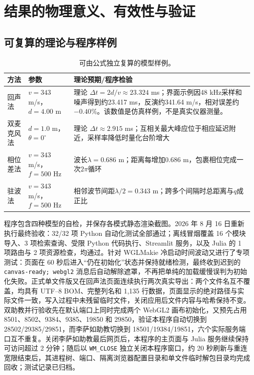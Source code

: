 \documentclass[UTF8,a4paper,zihao=-4]{ctexart}
\begin{document}
\section{结果的物理意义、有效性与验证}

\subsection{可复算的理论与程序样例}
\begin{table}[!htb]
\centering
\begin{tabularx}{\textwidth}{p{3.0cm}p{4.3cm}X}
\toprule
方法 & 参数 & 理论预期/程序检验\\
\midrule
回声法 & $v=343$ m/s，$d=4.00$ m & 理论 $\Delta t=2d/v\approx23.324$ ms；界面示例因48 kHz采样和噪声得到约23.417 ms，反演约341.64 m/s，相对误差约$-0.40\%$。该数值是仿真样例，不是真实仪器测量。\\
双麦克风法 & $d=1.0$ m，$\theta=0^\circ$ & 理论 $\Delta t\approx2.915$ ms；互相关最大峰应位于相应延迟附近，采样率降低时量化台阶增大\\
相位差法 & $v=343$ m/s，$f=500$ Hz & 波长$\lambda=0.686$ m；距离每增加0.686 m，包裹相位完成一次$2\pi$循环\\
驻波法 & $v=343$ m/s，$f=500$ Hz & 相邻波节间距$\lambda/2=0.343$ m；跨多个间隔时总距离与$q$成正比\\
\bottomrule
\end{tabularx}
\caption{可由公式独立复算的模型样例。}
\end{table}

程序包含四种模型的自检，并保存各模式静态渲染截图。2026 年 8 月 16 日重新执行最终验收：32/32 项 Python 自动化测试全部通过；离线冒烟覆盖 16 个模块导入、3 项检索查询、受限 Python 代码执行、Streamlit 服务，以及 Julia 的 1 项路由与 2 项资源检查，均通过。针对 WGLMakie 冷启动时间波动又进行了专项测试：页面在 60 秒后进入“仍在初始化”状态并保持就绪检测，最终收到迟到的 \texttt{canvas-ready; webgl2} 消息后自动解除遮罩，不再把单纯的加载缓慢误判为初始化失败。正式单文件版又在回声法页面连续执行两次真实导出：两个文件名互不覆盖，均具有 UTF--8 BOM、完整列名和 1,135 行数据，页面显示的绝对路径与实际文件一致，写入过程中未残留临时文件，关闭应用后文件内容与哈希保持不变。双助教并行验收先在默认端口上同时完成两个 WebGL2 画布初始化，又预先占用 8501、8502、9384、9385、19850 和 29850，验证本程序自动切换到 28502/29385/29851，而李萨如助教切换到 18501/19384/19851，六个实际服务端口互不重复。关闭李萨如助教最后网页后，本程序的主页面与 Julia 服务继续保持可访问超过 2 分钟；随后以 \texttt{WM\_CLOSE} 独立关闭本程序窗口，约 20 秒刷新与重连宽限结束后，其进程树、端口、隔离浏览器配置目录和单文件临时解包目录均完成回收；测试记录已归档。
\end{document}
